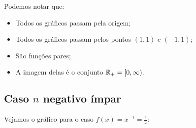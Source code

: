 \begin{center}
\end{center}

    Podemos notar que:
    \begin{itemize}
        \item Todos os gráficos passam pela origem;
        \item Todos os gráficos passam pelos pontos $(1,1)$ e $(-1,1)$;
        \item São funções pares;
        \item A imagem delas é o conjunto $\mathbb{R}_{+}=[0,\infty)$.
    \end{itemize}

    \subsection{Caso $n$ negativo ímpar}

Vejamos o gráfico para o caso $f(x)=x^{-1}=\frac{1}{x}$:
\begin{center}
\end{center}


